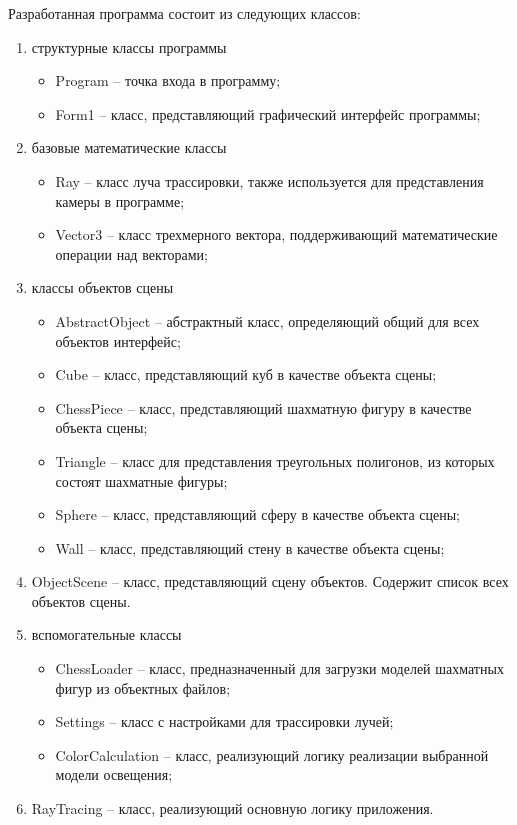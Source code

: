 Разработанная программа состоит из следующих классов:
\begin{enumerate}
	\item структурные классы программы
	\begin{itemize}
		\item Program -- точка входа в программу;
		\item Form1 -- класс, представляющий графический интерфейс программы;
	\end{itemize}
	\item базовые математические классы
	\begin{itemize}
		\item Ray -- класс луча трассировки, также используется для представления камеры в программе;
		\item Vector3 -- класс трехмерного вектора, поддерживающий математические операции над векторами;
	\end{itemize}
	\item классы объектов сцены
	\begin{itemize}
		\item AbstractObject -- абстрактный класс, определяющий общий для всех объектов интерфейс;
		\item Cube -- класс, представляющий куб в качестве объекта сцены;
		\item ChessPiece -- класс, представляющий шахматную фигуру в качестве объекта сцены;
		\item Triangle -- класс для представления треугольных полигонов, из которых состоят шахматные фигуры;
		\item Sphere -- класс, представляющий сферу в качестве объекта сцены;
		\item Wall -- класс, представляющий стену в качестве объекта сцены;
	\end{itemize}
	\item ObjectScene -- класс, представляющий сцену объектов. Содержит список всех объектов сцены.
	\item вспомогательные классы
	\begin{itemize}
		\item ChessLoader -- класс, предназначенный для загрузки моделей шахматных фигур из объектных файлов;
		\item Settings -- класс с настройками для трассировки лучей;
		\item ColorCalculation -- класс, реализующий логику реализации выбранной модели освещения;
	\end{itemize}
	\item RayTracing -- класс, реализующий основную логику приложения.
\end{enumerate}


